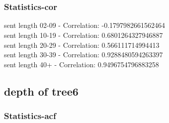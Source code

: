 \documentclass{article}%
\begin{document}
\begin{figure}[ht]%
\centering%
\setlength{\abovecaptionskip}{-35pt}%
%
%
\\%
%
%
\\%
%
\end{figure}

%
\newpage%
\subsubsection{Statistics{-}cor}%
\label{ssubsec:Statistics{-}cor}%
\noindent%
sent length 02-09 - Correlation: -0.1797982661562464\\%
sent length 10-19 - Correlation: 0.6801264327946887\\%
sent length 20-29 - Correlation: 0.566111714994413\\%
sent length 30-39 - Correlation: 0.9288480594263397\\%
sent length 40+ - Correlation: 0.9496754796883258\\

%
\newpage

%
\subsection{depth of tree6}%
\label{subsec:depthoftree6}%
\subsubsection{Statistics{-}acf}%
\label{ssubsec:Statistics{-}acf}%
\end{document}
